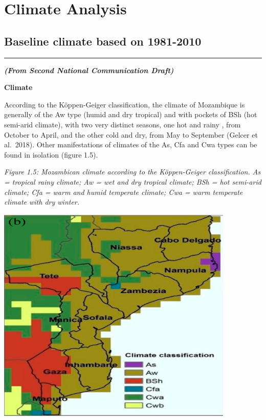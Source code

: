 \documentclass[
]{book}
\begin{document}
\hypertarget{climate-analysis}{%
\section{Climate Analysis}\label{climate-analysis}}

\hypertarget{baseline-climate-based-on-1981-2010}{%
\subsection{Baseline climate based on 1981-2010}\label{baseline-climate-based-on-1981-2010}}

\begin{center}\rule{0.5\linewidth}{0.5pt}\end{center}

\textbf{\emph{(From Second National Communication Draft)}}

\textbf{Climate}

According to the Köppen-Geiger classification, the climate of Mozambique is generally of the Aw type (humid and dry tropical) and with pockets of BSh (hot semi-arid climate), with two very distinct seasons, one hot and rainy , from October to April, and the other cold and dry, from May to September (Gelcer et al.~2018). Other manifestations of climates of the As, Cfa and Cwa types can be found in isolation (figure 1.5).

\emph{Figure 1.5: Mozambican climate according to the Köppen-Geiger classification. As = tropical rainy climate; Aw = wet and dry tropical climate; BSh = hot semi-arid climate; Cfa = warm and humid temperate climate; Cwa = warm temperate climate with dry winter.}

\includegraphics[width=0.85\textwidth,height=\textheight]{Climate-classification.png}
\end{document}
